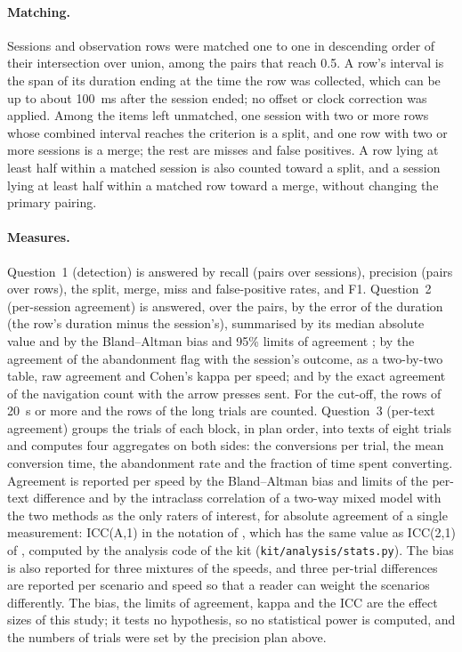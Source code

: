 \paragraph{Matching.} Sessions and observation rows were matched one to one in descending order of their intersection
over union, among the pairs that reach 0.5. A row's interval is the span of its duration ending at the time the row
was collected, which can be up to about 100~ms after the session ended; no offset or clock correction was applied. Among the items left unmatched, one session with two or more rows
whose combined interval reaches the criterion is a split, and one row with two or more sessions is a merge; the rest
are misses and false positives. A row lying at least half within a matched session is also counted toward a split,
and a session lying at least half within a matched row toward a merge, without changing the primary pairing.

\paragraph{Measures.} Question~1 (detection) is answered by recall (pairs over sessions), precision (pairs over rows),
the split, merge, miss and false-positive rates, and F1. Question~2 (per-session agreement) is answered, over the
pairs, by the error of the duration (the row's duration minus the session's), summarised by its median absolute value
and by the Bland--Altman bias and 95\% limits of agreement \citep{blandaltman1986}; by the agreement of the
abandonment flag with the session's outcome, as a two-by-two table, raw agreement and Cohen's kappa \citep{cohen1960}
per speed; and by the exact agreement of the navigation count with the arrow presses sent. For the cut-off, the rows of
20~s or more and the rows of the long trials are counted. Question~3 (per-text agreement) groups the trials of each
block, in plan order, into texts of eight trials and computes four aggregates on both sides: the conversions per
trial, the mean conversion time, the abandonment rate and the fraction of time spent converting. Agreement is reported
per speed by the Bland--Altman bias and limits of the per-text difference and by the intraclass correlation of a
two-way mixed model with the two methods as the only raters of interest, for absolute agreement of a single
measurement: ICC(A,1) in the notation of \citet{mcgrawwong1996}, which has the same value as ICC(2,1) of
\citet{shroutfleiss1979}, computed by the analysis code of the kit (\texttt{kit/analysis/stats.py}). The bias is also
reported for three mixtures of the speeds, and three per-trial differences are reported per scenario and speed so that
a reader can weight the scenarios differently. The bias, the limits of agreement, kappa and the ICC are the effect sizes
of this study; it tests no hypothesis, so no statistical power is computed, and the numbers of trials were set by the
precision plan above.

